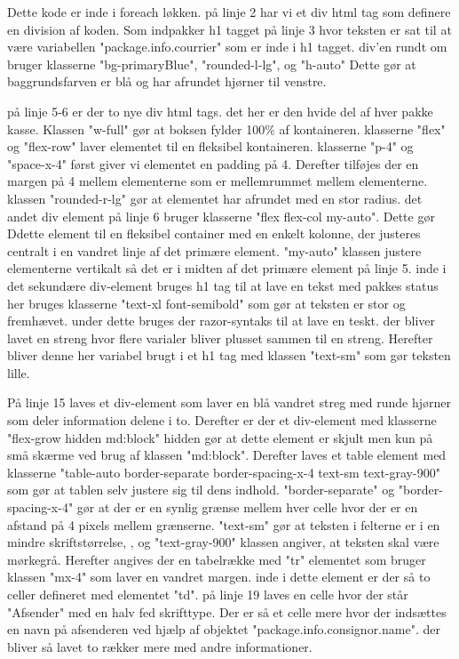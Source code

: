 Dette kode er inde i foreach løkken. på linje 2 har vi et div html tag som definere en division af koden.
Som indpakker h1 tagget på linje 3 hvor teksten er sat til at være variabellen "package.info.courrier" som er 
inde i h1 tagget. div'en rundt om bruger klasserne "bg-primaryBlue", "rounded-l-lg", og "h-auto" Dette gør at baggrundsfarven er blå
og har afrundet hjørner til venstre. 

på linje 5-6 er der to nye div html tags. det her er den hvide del af hver pakke kasse. Klassen "w-full"
gør at boksen fylder 100\% af kontaineren. klasserne "flex" og "flex-row" laver elementet til en fleksibel kontaineren. klasserne "p-4" og "space-x-4"
først giver vi elementet en padding på 4. Derefter tilføjes der en margen på 4 mellem elementerne som er mellemrummet mellem elementerne. klassen "rounded-r-lg" gør
at elementet har afrundet med en stor radius. det andet div element på linje 6 bruger klasserne "flex flex-col my-auto".
Dette gør Ddette element til en fleksibel container med en enkelt kolonne, der justeres centralt i en vandret linje af det primære element.
"my-auto" klassen justere elementerne vertikalt så det er i midten af det primære element på linje 5. inde i det sekundære div-element bruges h1 tag 
til at lave en tekst med pakkes status her bruges klasserne "text-xl font-semibold" som gør at teksten er stor og fremhævet. under dette bruges 
der razor-syntaks til at lave en teskt. der bliver lavet en streng hvor flere varialer bliver plusset sammen til en streng.
Herefter bliver denne her variabel brugt i et h1 tag med klassen "text-sm" som gør teksten lille. 

På linje 15 laves et div-element som laver en blå vandret streg med runde hjørner som deler information delene i to.
Derefter er der et div-element med klasserne "flex-grow hidden md:block" hidden gør at dette element er skjult men kun på små skærme
ved brug af klassen "md:block". Derefter laves et table element  med klasserne "table-auto border-separate border-spacing-x-4 text-sm text-gray-900"
som gør at tablen selv justere sig til dens indhold. "border-separate" og "border-spacing-x-4" gør at der er en synlig grænse mellem hver celle hvor der er
en afstand på 4 pixels mellem grænserne. "text-sm" gør at teksten i felterne er i en mindre skriftstørrelse, , og "text-gray-900" 
klassen angiver, at teksten skal være mørkegrå. Herefter angives der en tabelrække med "tr" elementet som bruger klassen "mx-4" som laver en vandret margen.
inde i dette element er der så to celler defineret med elementet "td". på linje 19 laves en celle hvor der står "Afsender" med en halv fed skrifttype.
Der er så et celle mere hvor der indsættes en navn på afsenderen ved hjælp af objektet "package.info.consignor.name". der bliver så lavet to rækker mere med
andre informationer.

